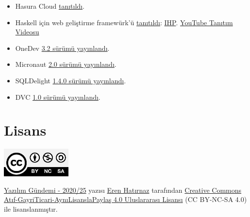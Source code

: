 \documentclass[11pt]{article}
\begin{document}
\begin{itemize}
\item Hasura Cloud \href{https://hasura.io/blog/announcing-hasura-cloud-managed-graphql-for-your-database-and-services/}{tanıtıldı}.
\item Haskell için web geliştirme framewürk'ü \href{https://ihp.digitallyinduced.com/}{tanıtıldı}: \href{https://github.com/digitallyinduced/ihp}{IHP}. \href{https://www.youtube.com/watch?v=UbDtS\_mUMpI\&feature=emb\_title}{YouTube Tanıtım
Videosu}
\item OneDev \href{https://www.onedev.io/v3.2.0/}{3.2 sürümü yayınlandı}.
\item Micronaut \href{https://objectcomputing.com/news/2020/06/26/announcing-micronaut-20}{2.0 sürümü yayınlandı}.
\item SQLDelight \href{https://github.com/cashapp/sqldelight/releases/tag/1.4.0}{1.4.0 sürümü yayınlandı}.
\item DVC \href{https://dvc.org/blog/dvc-1-0-release}{1.0 sürümü yayınlandı}.
\end{itemize}
\section{Lisans}
\label{sec:org8dc6922}
\begin{center}
\begin{center}
\includegraphics[height=1.5cm]{../../../img/CC_BY-NC-SA_4.0.png}
\end{center}

\href{yazilim-gundemi-2020-25.pdf}{Yazılım Gündemi - 2020/25} yazısı \href{https://erenhatirnaz.github.io}{Eren Hatırnaz} tarafından \href{http://creativecommons.org/licenses/by-nc-sa/4.0/}{Creative Commons
Atıf-GayriTicari-AynıLisanslaPaylaş 4.0 Uluslararası Lisansı} (CC BY-NC-SA 4.0)
ile lisanslanmıştır.
\end{center}
\end{document}
